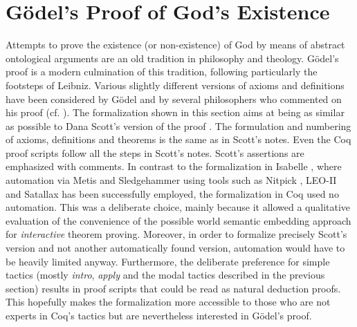 \documentclass{llncs}
\begin{document}
\section{G\"odel's Proof of God's Existence}
\label{sec:proof}

Attempts to prove the existence (or non-existence) of God by means of
abstract ontological arguments are an old tradition in philosophy and
theology.  
G\"{o}del's proof \cite{Goedel1970,GoedelNotes} is a modern culmination of
this tradition, following particularly the footsteps of Leibniz.
Various slightly different versions of axioms and definitions have
been considered by G\"{o}del and by several philosophers who commented
on his proof
(cf. \cite{sobel2004logic,AndersonGettings,Fitting,Adams,ContemporaryBibliography}). The formalization shown in this section aims at
being as similar as possible to Dana Scott's version of the proof \cite{ScottNotes}. The formulation and numbering of axioms, definitions and theorems is the same as in Scott's notes. Even the Coq proof scripts follow all the steps in Scott's notes. Scott's assertions are emphasized with comments. In contrast to the formalization in Isabelle \cite{Archiv}, where automation via Metis \cite{Hurd03first-orderproof} and Sledgehammer \cite{Sledgehammer} using tools such as Nitpick \cite{Nitpick}, LEO-II \cite{LEO-II} and Satallax \cite{Satallax} has been successfully employed, the formalization in Coq used no automation. This was a deliberate choice, mainly because it allowed a qualitative evaluation of the convenience of the possible world semantic embedding approach for \emph{interactive} theorem proving. Moreover, in order to formalize precisely Scott's version and not another automatically found version, automation would have to be heavily limited anyway. Furthermore, the deliberate preference for simple tactics (mostly \emph{intro}, \emph{apply} and the modal tactics described in the previous section) results in proof scripts that could be read as natural deduction proofs. This hopefully makes the formalization more accessible to those who are not experts in Coq's tactics but are nevertheless interested in G\"odel's proof.
\end{document}

